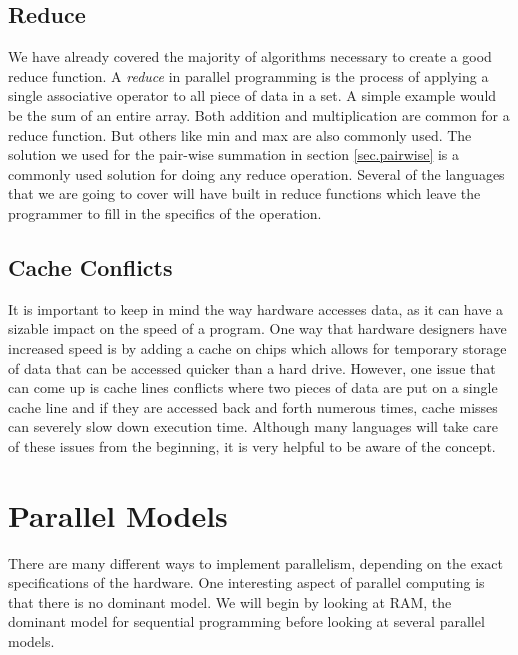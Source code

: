 \documentclass{article}
\newcommand{\comp}[1]{{\ttfamily #1}}
\begin{document}
    \subsection{Reduce}
    \label{sec.reduce}
    We have already covered the majority of algorithms necessary to create a good reduce function. A \emph{reduce} in parallel programming is the process of applying a single associative operator to all piece of data in a set. A simple example would be the sum of an entire array. Both addition and multiplication are common for a reduce function. But others like \comp{min} and \comp{max} are also commonly used. The solution we used for the pair-wise summation in section \ref{sec.pairwise} is a commonly used solution for doing any reduce operation. Several of the languages that we are going to cover will have built in reduce functions which leave the programmer to fill in the specifics of the operation. 


    \subsection{Cache Conflicts}
    It is important to keep in mind the way hardware accesses data, as it can have a sizable impact on the speed of a program. One way that hardware designers have increased speed is by adding a cache on chips which allows for temporary storage of data that can be accessed quicker than a hard drive. However, one issue that can come up is cache lines conflicts where two pieces of data are put on a single cache line and if they are accessed back and forth numerous times, cache misses can severely slow down execution time. Although many languages will take care of these issues from the beginning, it is very helpful to be aware of the concept.

  \section{Parallel Models}
  There are many different ways to implement parallelism, depending on the exact specifications of the hardware. One interesting aspect of parallel computing is that there is no dominant model. We will begin by looking at RAM, the dominant model for sequential programming before looking at several parallel models.
\end{document}
